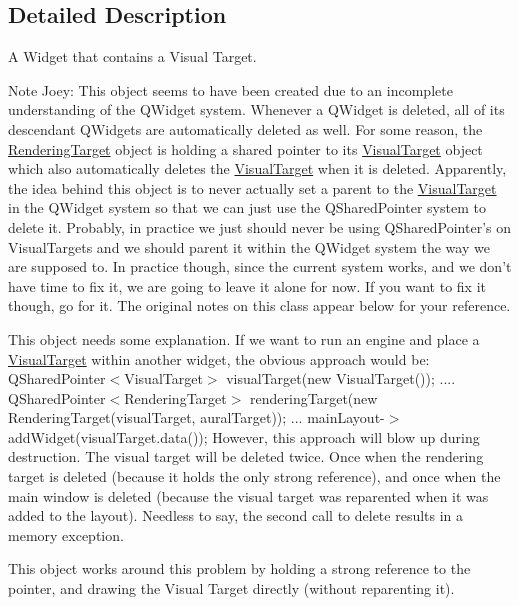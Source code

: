 \subsection{Detailed Description}
A Widget that contains a Visual Target. 

\begin{DoxyNote}{Note}
Joey\-: This object seems to have been created due to an incomplete understanding of the Q\-Widget system. Whenever a Q\-Widget is deleted, all of its descendant Q\-Widgets are automatically deleted as well. For some reason, the \hyperlink{struct_picto_1_1_rendering_target}{Rendering\-Target} object is holding a shared pointer to its \hyperlink{class_picto_1_1_visual_target}{Visual\-Target} object which also automatically deletes the \hyperlink{class_picto_1_1_visual_target}{Visual\-Target} when it is deleted. Apparently, the idea behind this object is to never actually set a parent to the \hyperlink{class_picto_1_1_visual_target}{Visual\-Target} in the Q\-Widget system so that we can just use the Q\-Shared\-Pointer system to delete it. Probably, in practice we just should never be using Q\-Shared\-Pointer's on Visual\-Targets and we should parent it within the Q\-Widget system the way we are supposed to. In practice though, since the current system works, and we don't have time to fix it, we are going to leave it alone for now. If you want to fix it though, go for it. The original notes on this class appear below for your reference.
\end{DoxyNote}
This object needs some explanation. If we want to run an engine and place a \hyperlink{class_picto_1_1_visual_target}{Visual\-Target} within another widget, the obvious approach would be\-: Q\-Shared\-Pointer$<$\-Visual\-Target$>$ visual\-Target(new Visual\-Target()); .... Q\-Shared\-Pointer$<$\-Rendering\-Target$>$ rendering\-Target(new Rendering\-Target(visual\-Target, aural\-Target)); ... main\-Layout-\/$>$add\-Widget(visual\-Target.\-data()); However, this approach will blow up during destruction. The visual target will be deleted twice. Once when the rendering target is deleted (because it holds the only strong reference), and once when the main window is deleted (because the visual target was reparented when it was added to the layout). Needless to say, the second call to delete results in a memory exception.

This object works around this problem by holding a strong reference to the pointer, and drawing the Visual Target directly (without reparenting it).

